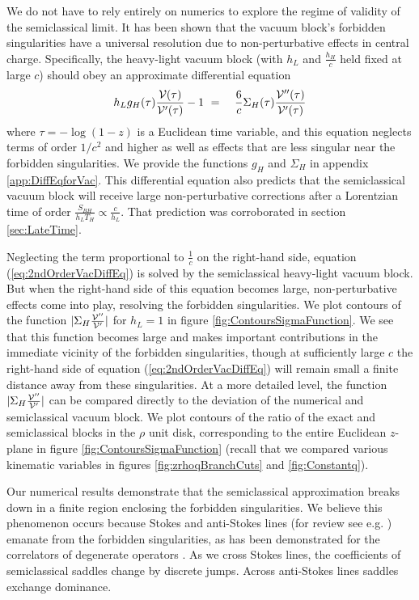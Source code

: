 \documentclass[12pt]{article}
\numberwithin{equation}{section}
\newcommand{\be}{\begin{eqnarray}}
\newcommand{\ee}{\end{eqnarray}}
\newcommand{\CV}{{\cal V}}
\begin{document}
We do not have to rely entirely on numerics to explore the regime of validity of the semiclassical limit.  It has been shown that the vacuum block's forbidden singularities have a universal resolution due to non-perturbative effects in central charge.  Specifically, the heavy-light  vacuum block (with $h_L$ and $\frac{h_H}{c}$ held  fixed at large $c$) should obey an approximate differential equation \cite{Fitzpatrick:2016ive}
\be
\label{eq:2ndOrderVacDiffEq}
h_L g_H(\tau) \frac{\CV(\tau)}{\CV'(\tau)} - 1\  &=&   \ \frac{6}{c} \Sigma_{H}(\tau) \frac{\CV''(\tau)}{\CV'(\tau)} 
\ee
where $\tau = -\log(1-z)$ is a Euclidean time variable, and this equation neglects terms of order $1/c^2$ and higher as well as effects that are less singular near the forbidden singularities.  We provide the functions $g_H$ and $\Sigma_H$ in appendix \ref{app:DiffEqforVac}.  This differential equation also predicts  \cite{Fitzpatrick:2016ive} that the semiclassical vacuum block will receive large non-perturbative corrections after a Lorentzian time of order $\frac{S_{BH}}{h_L T_H}  \propto \frac{c}{h_L}$. That prediction was corroborated  in section \ref{sec:LateTime}.



Neglecting the term proportional to $\frac{1}{c}$  on the right-hand side, equation (\ref{eq:2ndOrderVacDiffEq}) is solved by the semiclassical heavy-light vacuum block.  But when the right-hand side of this equation becomes large, non-perturbative effects come into play, resolving the forbidden singularities. We plot contours of the function $|\Sigma_{H} \frac{\CV''}{\CV'}|$ for $h_L = 1$ in figure \ref{fig:ContoursSigmaFunction}.  We see that this function becomes large and makes important contributions in the immediate vicinity of the forbidden singularities, though at sufficiently large $c$ the right-hand side of equation (\ref{eq:2ndOrderVacDiffEq}) will remain small a finite distance away from these singularities.  At a more detailed level, the function $|\Sigma_{H} \frac{\CV''}{\CV'}|$  can be compared directly to the deviation of the numerical and semiclassical vacuum block. We plot contours of the ratio of the exact and semiclassical blocks in the $\rho$ unit disk, corresponding to the entire Euclidean $z$-plane in figure \ref{fig:ContoursSigmaFunction} (recall that we compared various kinematic variables in figures \ref{fig:zrhoqBranchCuts} and \ref{fig:Constantq}).  


Our numerical results demonstrate that the semiclassical approximation breaks down  in a finite region enclosing the forbidden singularities.   We believe this phenomenon occurs because Stokes and anti-Stokes lines (for review see e.g. \cite{Witten:2010cx}) emanate from the forbidden singularities, as has been demonstrated for the correlators of degenerate operators \cite{Fitzpatrick:2016ive}.  As we cross Stokes lines, the coefficients of semiclassical saddles change by discrete jumps.  Across anti-Stokes lines saddles exchange dominance.  
\end{document}

